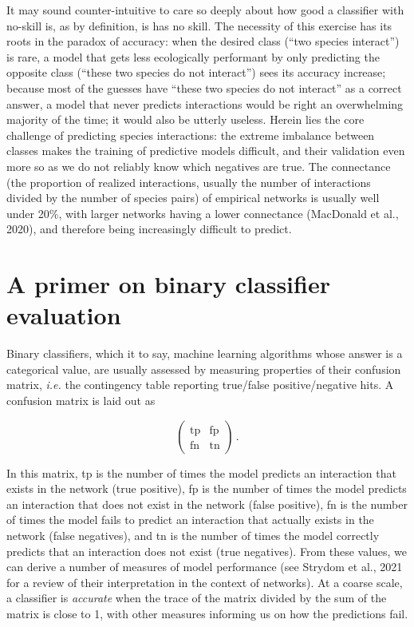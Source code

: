\documentclass[11pt]{article}
\begin{document}
It may sound counter-intuitive to care so deeply about how good a
classifier with no-skill is, as by definition, is has no skill. The
necessity of this exercise has its roots in the paradox of accuracy:
when the desired class (``two species interact'') is rare, a model that
gets less ecologically performant by only predicting the opposite class
(``these two species do not interact'') sees its accuracy increase;
because most of the guesses have ``these two species do not interact''
as a correct answer, a model that never predicts interactions would be
right an overwhelming majority of the time; it would also be utterly
useless. Herein lies the core challenge of predicting species
interactions: the extreme imbalance between classes makes the training
of predictive models difficult, and their validation even more so as we
do not reliably know which negatives are true. The connectance (the
proportion of realized interactions, usually the number of interactions
divided by the number of species pairs) of empirical networks is usually
well under 20\%, with larger networks having a lower connectance
(MacDonald et al., 2020), and therefore being increasingly difficult to
predict.

\hypertarget{a-primer-on-binary-classifier-evaluation}{%
\section{A primer on binary classifier
evaluation}\label{a-primer-on-binary-classifier-evaluation}}

Binary classifiers, which it to say, machine learning algorithms whose
answer is a categorical value, are usually assessed by measuring
properties of their confusion matrix, \emph{i.e.} the contingency table
reporting true/false positive/negative hits. A confusion matrix is laid
out as

\[\begin{pmatrix}
    \text{tp} & \text{fp} \\
    \text{fn} & \text{tn}
\end{pmatrix} \,.\]

In this matrix, tp is the number of times the model predicts an
interaction that exists in the network (true positive), fp is the number
of times the model predicts an interaction that does not exist in the
network (false positive), fn is the number of times the model fails to
predict an interaction that actually exists in the network (false
negatives), and tn is the number of times the model correctly predicts
that an interaction does not exist (true negatives). From these values,
we can derive a number of measures of model performance (see Strydom et
al., 2021 for a review of their interpretation in the context of
networks). At a coarse scale, a classifier is \emph{accurate} when the
trace of the matrix divided by the sum of the matrix is close to 1, with
other measures informing us on how the predictions fail.
\end{document}
